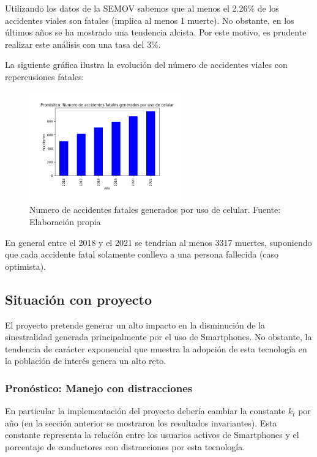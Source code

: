 \documentclass{article}
\begin{document}
Utilizando los datos de la SEMOV sabemos que al menos el 2.26\% de los accidentes viales
son fatales (implica al menos 1 muerte). No obstante, en los últimos años se ha mostrado una tendencia alcista. Por 
este motivo, es prudente realizar este análisis con una tasa del 3\%.

La siguiente gráfica ilustra la evolución del número de accidentes viales con repercusiones fatales:  

	\begin{figure}[H]\centering
	\includegraphics[width=0.6\textwidth]{resources/img/smart_accidents_deaths.png}
	\caption{\label{fig:prono_accidentes_fatales} Numero de accidentes fatales generados por uso de celular. Fuente: Elaboración propia}
    \end{figure}

En general entre el 2018 y el 2021 se tendrían al menos 3317 muertes, suponiendo que cada accidente fatal solamente 
conlleva a una persona fallecida (caso optimista). 

\subsection{Situación con proyecto}

El proyecto pretende generar un alto impacto en la disminución de la sinestralidad generada principalmente por el uso
de Smartphones. No obstante, la tendencia de carácter exponencial que muestra la adopción de esta tecnología en la
población de interés genera un alto reto.

\subsubsection{Pronóstico: Manejo con distracciones}

En particular la implementación del proyecto debería cambiar la constante $k_t$ por año (en la sección anterior
se mostraron los resultados invariantes). Esta constante representa la relación entre los usuarios activos de Smartphones
y el porcentaje de conductores con distracciones por esta tecnología.
\end{document}
